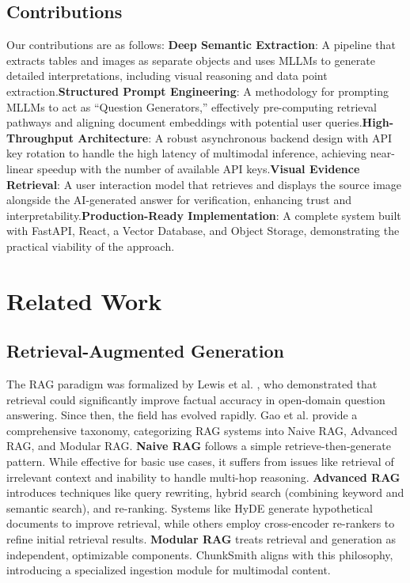 \documentclass[conference]{IEEEtran}
\begin{document}
\subsection{Contributions}
Our contributions are as follows:
\textbf{Deep Semantic Extraction}: A pipeline that extracts tables and images as separate objects and uses MLLMs to generate detailed interpretations, including visual reasoning and data point extraction.\textbf{Structured Prompt Engineering}: A methodology for prompting MLLMs to act as ``Question Generators,'' effectively pre-computing retrieval pathways and aligning document embeddings with potential user queries.\textbf{High-Throughput Architecture}: A robust asynchronous backend design with API key rotation to handle the high latency of multimodal inference, achieving near-linear speedup with the number of available API keys.\textbf{Visual Evidence Retrieval}: A user interaction model that retrieves and displays the source image alongside the AI-generated answer for verification, enhancing trust and interpretability.\textbf{Production-Ready Implementation}: A complete system built with FastAPI, React, a Vector Database, and Object Storage, demonstrating the practical viability of the approach.

\section{Related Work}
\subsection{Retrieval-Augmented Generation}
The RAG paradigm was formalized by Lewis et al. \cite{lewis2020retrieval}, who demonstrated that retrieval could significantly improve factual accuracy in open-domain question answering. Since then, the field has evolved rapidly. Gao et al. \cite{gao2023retrieval} provide a comprehensive taxonomy, categorizing RAG systems into Naive RAG, Advanced RAG, and Modular RAG.
\textbf{Naive RAG} follows a simple retrieve-then-generate pattern. While effective for basic use cases, it suffers from issues like retrieval of irrelevant context and inability to handle multi-hop reasoning.
\textbf{Advanced RAG} introduces techniques like query rewriting, hybrid search (combining keyword and semantic search), and re-ranking. Systems like HyDE \cite{gao2022precise} generate hypothetical documents to improve retrieval, while others employ cross-encoder re-rankers to refine initial retrieval results.
\textbf{Modular RAG} treats retrieval and generation as independent, optimizable components. ChunkSmith aligns with this philosophy, introducing a specialized ingestion module for multimodal content.
\end{document}
